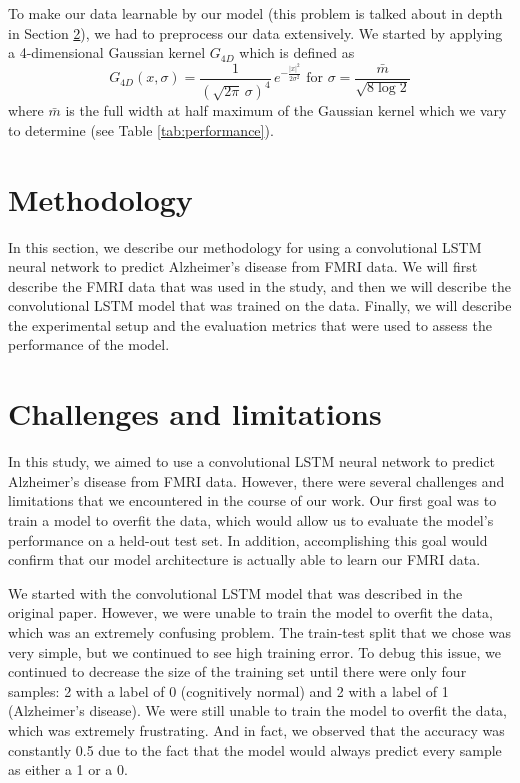 \documentclass[10pt]{article}
\begin{document}
	To make our data learnable by our model (this problem is talked about in depth in Section \ref{sec:challenges}), we had to preprocess our data extensively. We started by applying a 4-dimensional Gaussian kernel $G_{4D}$ which is defined as 
	$$G_{4D}\left(x,\sigma\right)=\frac{1}{\left(\sqrt{2\pi}\,\sigma\right)^4}\,e^{-\frac{|x|^2}{2\sigma^2}}\text{ for }\sigma=\frac{\bar{m}}{\sqrt{8\log2}}$$
	where $\bar{m}$ is the full width at half maximum of the Gaussian kernel which we vary to determine (see Table \ref{tab:performance}).
	
	
	\section{Methodology}

	In this section, we describe our methodology for using a convolutional LSTM neural network to predict Alzheimer's disease from FMRI data. We will first describe the FMRI data that was used in the study, and then we will describe the convolutional LSTM model that was trained on the data. Finally, we will describe the experimental setup and the evaluation metrics that were used to assess the performance of the model.

	\section{Challenges and limitations}
	\label{sec:challenges}

	In this study, we aimed to use a convolutional LSTM neural network to predict Alzheimer's disease from FMRI data. However, there were several challenges and limitations that we encountered in the course of our work. Our first goal was to train a model to overfit the data, which would allow us to evaluate the model's performance on a held-out test set. In addition, accomplishing this goal would confirm that our model architecture is actually able to learn our FMRI data.

	We started with the convolutional LSTM model that was described in the original paper. However, we were unable to train the model to overfit the data, which was an extremely confusing problem. The train-test split that we chose was very simple, but we continued to see high training error. To debug this issue, we continued to decrease the size of the training set until there were only four samples: 2 with a label of 0 (cognitively normal) and 2 with a label of 1 (Alzheimer's disease). We were still unable to train the model to overfit the data, which was extremely frustrating. And in fact, we observed that the accuracy was constantly 0.5 due to the fact that the model would always predict every sample as either a 1 or a 0.
\end{document}
